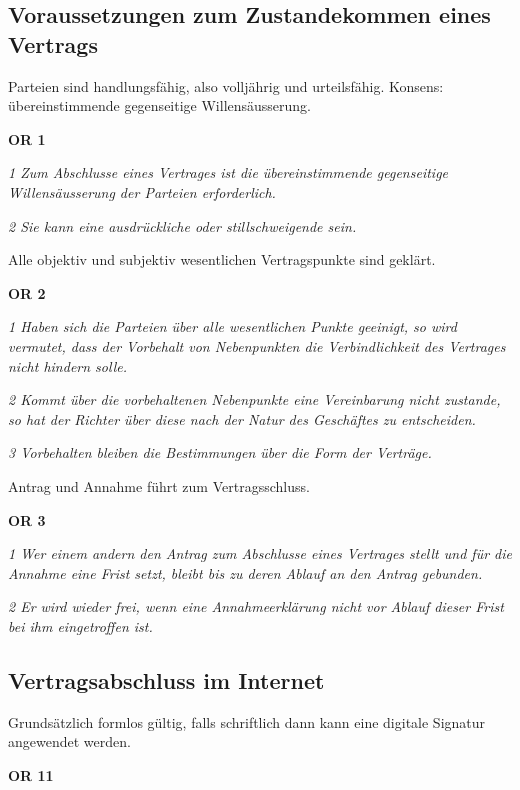 \subsection{Voraussetzungen zum Zustandekommen eines Vertrags}

Parteien sind handlungsfähig, also volljährig und urteilsfähig.
Konsens: übereinstimmende gegenseitige Willensäusserung.
  
\noindent
  \textbf{OR 1} 
  
  \textit{
    1 Zum Abschlusse eines Vertrages ist die übereinstimmende gegenseitige Willensäusserung der Parteien erforderlich.}
    
  \textit{2 Sie kann eine ausdrückliche oder stillschweigende sein.}

\vspace{3mm}
\noindent
Alle objektiv und subjektiv wesentlichen Vertragspunkte sind geklärt.
    
\noindent
  \textbf{OR 2} 
    
  \textit{
    1 Haben sich die Parteien über alle wesentlichen Punkte geeinigt, so wird vermutet, dass der Vorbehalt von Nebenpunkten die Verbindlichkeit des Vertrages nicht hindern solle.}
    
  \textit{
    2 Kommt über die vorbehaltenen Nebenpunkte eine Vereinbarung nicht zustande, so hat der Richter über diese nach der Natur des Geschäftes zu entscheiden.}
      
  \textit{
    3 Vorbehalten bleiben die Bestimmungen über die Form der Verträge.}

\vspace{3mm}
\noindent
Antrag und Annahme führt zum Vertragsschluss.
  
\noindent
  \textbf{OR 3} 
  
  \textit{
    1 Wer einem andern den Antrag zum Abschlusse eines Vertrages stellt und für die Annahme eine Frist setzt, bleibt bis zu deren Ablauf an den Antrag gebunden.}
  
  \textit{
    2 Er wird wieder frei, wenn eine Annahmeerklärung nicht vor Ablauf dieser Frist bei ihm eingetroffen ist.}

\subsection{Vertragsabschluss im Internet}

Grundsätzlich formlos gültig, falls schriftlich dann kann eine digitale Signatur angewendet werden.

\noindent
\textbf{OR 11}

